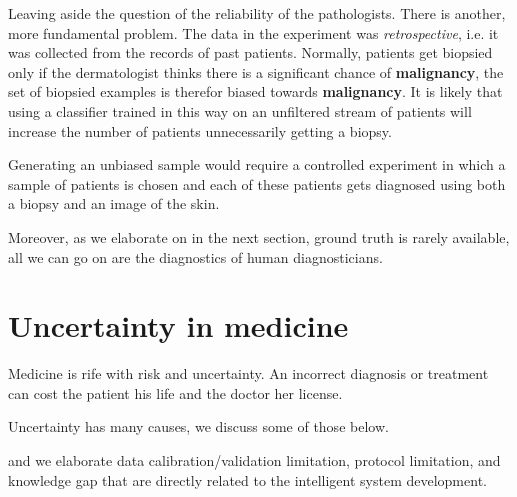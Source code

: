 \documentclass[11pt]{pnas-new}
\begin{document}
Leaving aside the question of the reliability of the
pathologists. There is another, more fundamental problem. The data
in the experiment was {\em retrospective}, i.e. it was collected from
the records of past patients. Normally, patients get
biopsied only if the dermatologist thinks there is a significant chance of
{\bf malignancy}, the set of biopsied examples is therefor biased towards
{\bf malignancy}. It is likely that using a classifier trained in this way
on an unfiltered stream of patients will increase the number of
patients unnecessarily getting a biopsy.

Generating an unbiased sample would require a controlled experiment in
which a sample of patients is chosen and each of these patients gets
diagnosed using both a biopsy and an image of the skin.

Moreover, as we elaborate on in the next section, ground truth is
rarely available, all we can go on are the diagnostics of human diagnosticians.

\section{Uncertainty in medicine}

Medicine is rife with risk and uncertainty. An incorrect diagnosis or
treatment can cost the patient his life and the doctor her license.

Uncertainty has many causes, we discuss some of those below.


\iffalse
and we elaborate data calibration/validation limitation, protocol limitation, and knowledge gap that are directly related to the intelligent system development. 
\end{document}
